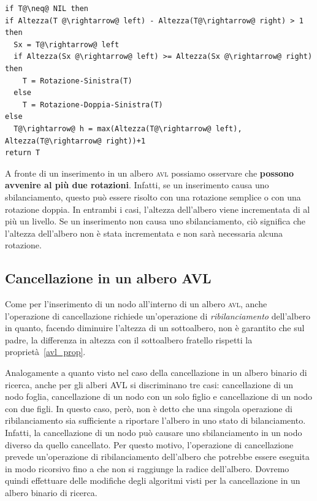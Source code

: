 \begin{lstlisting}[label=lst:bilancia-sx,caption={Bilancia-Sx(T)},language=asd]
if T@\neq@ NIL then
if Altezza(T @\rightarrow@ left) - Altezza(T@\rightarrow@ right) > 1 then
  Sx = T@\rightarrow@ left
  if Altezza(Sx @\rightarrow@ left) >= Altezza(Sx @\rightarrow@ right) then
    T = Rotazione-Sinistra(T)
  else
    T = Rotazione-Doppia-Sinistra(T)
else
  T@\rightarrow@ h = max(Altezza(T@\rightarrow@ left), Altezza(T@\rightarrow@ right))+1
return T
\end{lstlisting}


\begin{osservation}
A fronte di un inserimento in un albero \textsc{avl} possiamo osservare che \textbf{possono avvenire al più due rotazioni}. Infatti, se un inserimento causa uno sbilanciamento, questo può essere risolto con una rotazione semplice o con una rotazione doppia. In entrambi i casi, l'altezza dell'albero viene incrementata di al più un livello. Se un inserimento non causa uno sbilanciamento, ciò significa che l'altezza dell'albero non è stata incrementata e non sarà necessaria alcuna rotazione.
\end{osservation}


\subsection{Cancellazione in un albero AVL}
Come per l'inserimento di un nodo all'interno di un albero \textsc{avl}, anche l'operazione di cancellazione richiede un'operazione di \textit{ribilanciamento} dell'albero in quanto, facendo diminuire l'altezza di un sottoalbero, non è garantito che sul padre, la differenza in altezza con il sottoalbero fratello rispetti la proprietà~\ref{avl_prop}.

Analogamente a quanto visto nel caso della cancellazione in un albero binario di ricerca, anche per gli alberi AVL si discriminano tre casi: cancellazione di un nodo foglia, cancellazione di un nodo con un solo figlio e cancellazione di un nodo con due figli.  In questo caso, però, non è detto che una singola operazione di ribilanciamento sia sufficiente a riportare l'albero in uno stato di bilanciamento. Infatti, la cancellazione di un nodo può causare uno sbilanciamento in un nodo diverso da quello cancellato. Per questo motivo, l'operazione di cancellazione prevede un'operazione di ribilanciamento dell'albero che potrebbe essere eseguita in modo ricorsivo fino a che non si raggiunge la radice dell'albero. Dovremo quindi effettuare delle modifiche degli algoritmi visti per la cancellazione in un albero binario di ricerca.

